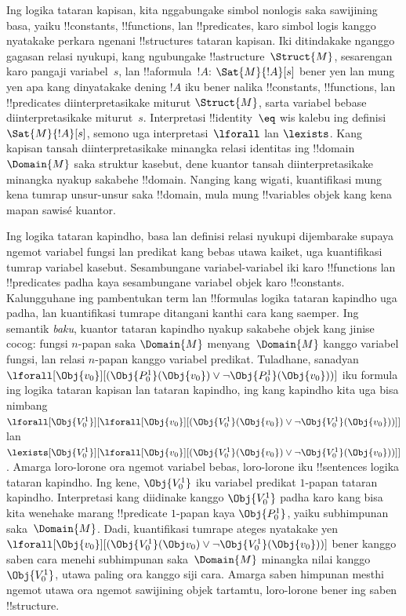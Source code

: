\documentclass[../../../include/open-logic-section]{subfiles}
\begin{document}


Ing logika tataran kapisan, kita nggabungake simbol nonlogis saka
sawijining basa, yaiku !!{constant}s, !!{function}s, lan
!!{predicate}s, karo simbol logis kanggo nyatakake perkara ngenani
!!{structure}s tataran kapisan. Iki ditindakake nganggo gagasan
relasi nyukupi, kang ngubungake !!a{structure}~$\Struct{M}$,
sesarengan karo pangaji variabel~$s$, lan !!a{formula}~$!A$:
$\Sat{M}{!A}[s]$ bener yen lan mung yen apa kang dinyatakake
dening $!A$ iku bener nalika !!{constant}s, !!{function}s, lan
!!{predicate}s diinterpretasikake miturut $\Struct{M}$, sarta
variabel bebase diinterpretasikake miturut~$s$. Interpretasi
!!{identity}~$\eq$ wis kalebu ing definisi
$\Sat{M}{!A}[s]$, semono uga interpretasi~$\lforall$ lan
$\lexists$. Kang kapisan tansah diinterpretasikake minangka relasi
identitas ing !!{domain}~$\Domain{M}$ saka struktur kasebut,
dene kuantor tansah diinterpretasikake minangka nyakup sakabehe
!!{domain}. Nanging kang wigati, kuantifikasi mung kena tumrap
unsur-unsur saka !!{domain}, mula mung !!{variable}s objek kang
kena mapan sawisé kuantor.

Ing logika tataran kapindho, basa lan definisi relasi nyukupi
dijembarake supaya ngemot variabel fungsi lan predikat kang bebas
utawa kaiket, uga kuantifikasi tumrap variabel kasebut.
Sesambungane variabel-variabel iki karo !!{function}s lan
!!{predicate}s padha kaya sesambungane variabel objek karo
!!{constant}s. Kalungguhane ing pambentukan term lan !!{formula}s
logika tataran kapindho uga padha, lan kuantifikasi tumrape ditangani
kanthi cara kang saemper. Ing semantik \emph{baku}, kuantor
tataran kapindho nyakup sakabehe objek kang jinise cocog:
fungsi $n$-papan saka $\Domain{M}$ menyang~$\Domain{M}$ kanggo
variabel fungsi, lan relasi $n$-papan kanggo variabel predikat.
Tuladhane, sanadyan
$\lforall[\Obj{v_0}][(\Obj{P^1_0}(\Obj{v_0}) \lor \lnot
  \Obj{P^1_0}(\Obj{v_0}))]$ iku formula ing logika tataran kapisan
lan tataran kapindho, ing kang kapindho kita uga bisa nimbang
$\lforall[\Obj{V^1_0}][\lforall[\Obj{v_0}][(\Obj{V^1_0}(\Obj{v_0}) \lor
    \lnot \Obj{V^1_0}(\Obj{v_0}))]]$ lan
$\lexists[\Obj{V^1_0}][\lforall[\Obj{v_0}][(\Obj{V^1_0}(\Obj{v_0}) \lor
    \lnot \Obj{V^1_0}(\Obj{v_0}))]]$. Amarga loro-lorone ora ngemot
variabel bebas, loro-lorone iku !!{sentence}s logika tataran kapindho.
Ing kene, $\Obj{V^1_0}$ iku variabel predikat $1$-papan tataran
kapindho. Interpretasi kang diidinake kanggo $\Obj{V^1_0}$
padha karo kang bisa kita wenehake marang !!{predicate} $1$-papan
kaya $\Obj{P^1_0}$, yaiku subhimpunan
saka~$\Domain{M}$. Dadi, kuantifikasi tumrape ateges nyatakake yen
$\lforall[\Obj{v_0}][(\Obj{V^1_0}(\Obj v_0) \lor \lnot
  \Obj{V^1_0}(\Obj{v_0}))]$ bener kanggo saben cara menehi subhimpunan
saka~$\Domain{M}$ minangka nilai kanggo $\Obj{V^1_0}$,
utawa paling ora kanggo siji cara. Amarga saben himpunan mesthi
ngemot utawa ora ngemot sawijining objek tartamtu, loro-lorone
bener ing saben !!{structure}.
\end{document}
